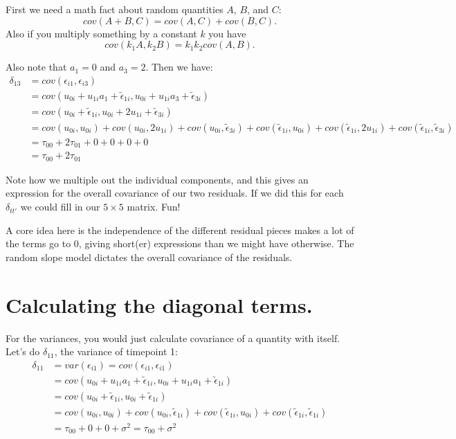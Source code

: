 \documentclass[
  letterpaper,
  DIV=11,
  numbers=noendperiod]{scrreprt}
\begin{document}
First we need a math fact about random quantities \(A\), \(B\), and
\(C\): \[cov( A + B, C ) = cov( A, C ) + cov( B, C ) .\] Also if you
multiply something by a constant \(k\) you have
\[cov( k_1 A, k_2 B ) = k_1 k_2 cov( A, B ) .\]

Also note that \(a_1 = 0\) and \(a_3 = 2\). Then we have:
\[\begin{aligned}
\delta_{13} &= cov( \epsilon_{i1}, \epsilon_{i3} ) \\
   &= cov(  u_{0i} + u_{1i} a_1 + \tilde{\epsilon}_{1i},  u_{0i} + u_{1i} a_3 + \tilde{\epsilon}_{3i} ) \\
   &= cov(  u_{0i}  + \tilde{\epsilon}_{1i},  u_{0i} + 2 u_{1i} + \tilde{\epsilon}_{3i} ) \\
   &= cov(  u_{0i}, u_{0i} ) + cov( u_{0i}, 2 u_{1i} ) + cov( u_{0i}, \tilde{\epsilon}_{3i} ) + cov( \tilde{\epsilon}_{1i}, u_{0i}) + cov( \tilde{\epsilon}_{1i}, 2 u_{1i} )  + cov( \tilde{\epsilon}_{1i}, \tilde{\epsilon}_{3i}) \\
   &= \tau_{00} + 2\tau_{01} + 0 + 0 + 0 + 0 \\
   &= \tau_{00} + 2\tau_{01} 
\end{aligned}\]

Note how we multiple out the individual components, and this gives an
expression for the overall covariance of our two residuals. If we did
this for each \(\delta_{tt'}\) we could fill in our \(5 \times 5\)
matrix. Fun!

A core idea here is the independence of the different residual pieces
makes a lot of the terms go to 0, giving short(er) expressions than we
might have otherwise. The random slope model dictates the overall
covariance of the residuals.

\hypertarget{calculating-the-diagonal-terms.}{%
\section{Calculating the diagonal
terms.}\label{calculating-the-diagonal-terms.}}

For the variances, you would just calculate covariance of a quantity
with itself. Let's do \(\delta_{11}\), the variance of timepoint 1:
\[\begin{aligned}
\delta_{11} &= var( \epsilon_{i1} ) = cov( \epsilon_{i1}, \epsilon_{i1} ) \\
   &= cov(  u_{0i} + u_{1i} a_1 + \tilde{\epsilon}_{1i},  u_{0i} + u_{1i} a_1 + \tilde{\epsilon}_{1i} ) \\
   &= cov(  u_{0i}  + \tilde{\epsilon}_{1i},  u_{0i} + \tilde{\epsilon}_{1i} ) \\
   &= cov(  u_{0i}, u_{0i} ) + cov( u_{0i},  \tilde{\epsilon}_{1i} ) + cov( \tilde{\epsilon}_{1i}, u_{0i}) + cov( \tilde{\epsilon}_{1i},\tilde{\epsilon}_{1i} )  \\
   &= \tau_{00} + 0 + 0 + \sigma^2 =  \tau_{00} + \sigma^2
\end{aligned}\]
\end{document}
